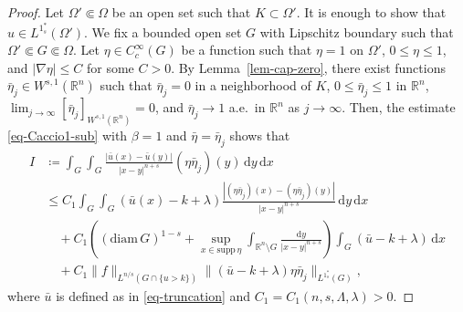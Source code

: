 \documentclass[10pt,a4paper]{amsart}
\begin{document}
\begin{proof}
Let $\Omega' \Subset \Omega$ be an open set such that $K \subset \Omega'$. It is enough to show that $u \in L^{1^{\ast}_s}(\Omega')$. We fix a bounded open set $G$ with Lipschitz boundary such that $\Omega' \Subset G \Subset \Omega$. Let $\eta \in C^\infty_c(G)$ be a function such that $\eta =1$ on $\Omega'$, $0 \leq \eta \leq 1$, and $|\nabla \eta| \leq C$ for some $C>0$. By Lemma~\ref{lem-cap-zero}, there exist functions $\bar{\eta}_j \in W^{s, 1}(\mathbb{R}^n)$ such that $\bar{\eta}_j=0$ in a neighborhood of $K$, $0 \leq \bar{\eta}_j \leq 1$ in $\mathbb{R}^n$, $\lim_{j\to \infty} [\bar{\eta}_j]_{W^{s,1}(\mathbb{R}^n)} = 0$, and $\bar{\eta}_j \to 1$ a.e.\ in $\mathbb{R}^n$ as $j \to \infty$. Then, the estimate \eqref{eq-Caccio1-sub} with $\beta=1$ and $\bar{\eta}=\bar{\eta}_j$ shows that
\begin{align*}
I
&\coloneqq \int_{G} \int_{G} \frac{|\bar{u}(x) - \bar{u}(y)|}{|x-y|^{n+s}} (\eta\bar{\eta}_j)(y) \,\mathrm{d}y \,\mathrm{d}x \\
&\leq C_1 \int_{G} \int_{G} (\bar{u}(x)-k+\lambda) \frac{|(\eta\bar{\eta}_j)(x)-(\eta\bar{\eta}_j)(y)|}{|x-y|^{n+s}} \,\mathrm{d}y \,\mathrm{d}x \\
&\quad + C_1 \left( (\mathrm{diam}\, G)^{1-s} + \sup_{x \in \mathrm{supp}\,\eta} \int_{\mathbb{R}^n \setminus G} \frac{\mathrm{d}y}{|x-y|^{n+s}} \right) \int_{G} (\bar{u}-k+\lambda) \,\mathrm{d}x \\
&\quad + C_1 \|f\|_{L^{n/s}(G \cap \{u>k\})} \|(\bar{u}-k+\lambda)\eta\bar{\eta}_j\|_{L^{1^{\ast}_s}(G)},
\end{align*}
where $\bar{u}$ is defined as in \eqref{eq-truncation} and $C_1=C_1(n, s, \Lambda, \lambda)>0$.


\end{proof}
\end{document}
